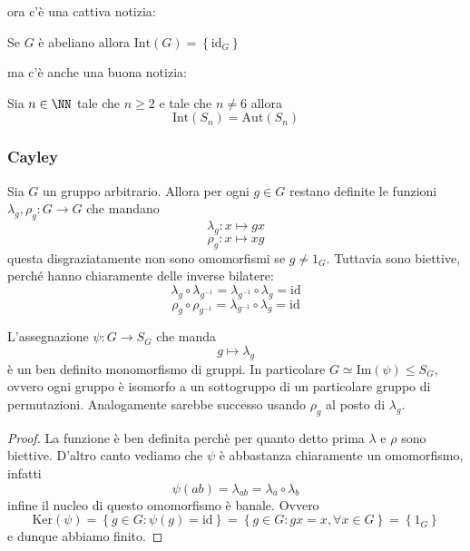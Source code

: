 \documentclass[11pt]{scrartcl}
\newcommand{\Immagine}[1]{\text{Im}\!\left(#1\right)}
\renewcommand{\ker}[1]{\text{Ker}\!\left(#1\right)}
\begin{document}
	ora c'è una cattiva notizia:
	\begin{corollary}
		Se $G$ è abeliano allora $\text{Int}(G)=\left\{\text{id}_G\right\}$ 
	\end{corollary}
	ma c'è anche una buona notizia:
	\begin{theorem}
		Sia $n\in\NN$ tale che $n\ge 2$ e tale che $n\ne 6$ allora
		$$\text{Int}(S_n)=\text{Aut}(S_n)$$
	\end{theorem}
	\subsubsection{Cayley}
	Sia $G$ un gruppo arbitrario. Allora per ogni $g\in G$ restano definite le funzioni $\lambda_g,\rho_g:G\to G$ che mandano 
	$$\lambda_g:x\mapsto gx$$
	$$\rho_g:x\mapsto xg$$
	questa disgraziatamente non sono omomorfismi se $g\ne 1_G$. Tuttavia sono biettive, perché hanno chiaramente delle inverse bilatere:
	$$\lambda_g\circ \lambda_{g^{-1}}=\lambda_{g^{-1}} \circ \lambda_g = \text{id}$$
	$$\rho_g\circ \rho_{g^{-1}}=\lambda_{g^{-1}} \circ \lambda_g = \text{id}$$
	
	\begin{theorem}[Cayley]
	L'assegnazione $\psi:G\to S_{G}$ che manda
	$$g\mapsto \lambda_g$$
	è un ben definito monomorfismo di gruppi. In particolare $G\simeq \Immagine{\psi}\le S_G$, ovvero ogni gruppo è isomorfo a un sottogruppo di un particolare gruppo di permutazioni. Analogamente sarebbe successo usando $\rho_g$ al posto di $\lambda_g$.
	\end{theorem}
	\begin{proof}
		La funzione è ben definita perchè per quanto detto prima $\lambda$ e $\rho$ sono biettive. D'altro canto vediamo che $\psi$ è abbastanza chiaramente un omomorfismo, infatti
		$$\psi(ab)=\lambda_{ab}=\lambda_a\circ \lambda_b$$
		infine il nucleo di questo omomorfismo è banale. Ovvero
		$$\ker{\psi}=\left\{g\in G:\psi(g)=\text{id}\right\}=\left\{g\in G:gx=x,\forall x\in G\right\}=\left\{1_G\right\}$$
		e dunque abbiamo finito.
	\end{proof}
	
	\newpage
	
\end{document}
